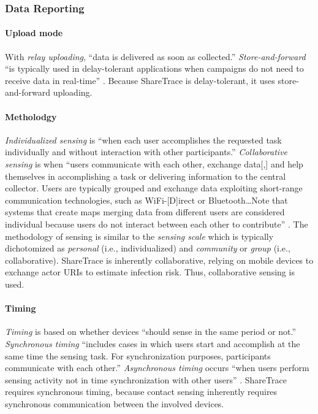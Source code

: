 \subsubsection{Data Reporting}

\paragraph{Upload mode}

With \emph{relay uploading}, ``data is delivered as soon as collected.'' \emph{Store-and-forward} ``is typically used in delay-tolerant applications when campaigns do not need to receive data in real-time'' \citep{Capponi2019}. Because ShareTrace is delay-tolerant, it uses store-and-forward uploading.

\paragraph{Metholodgy}

\emph{Individualized sensing} is ``when each user accomplishes the requested task individually and without interaction with other participants.'' \emph{Collaborative sensing} is when ``users communicate with each other, exchange data[,] and help themselves in accomplishing a task or delivering information to the central collector. Users are typically grouped and exchange data exploiting short-range communication technologies, such as WiFi-[D]irect or Bluetooth{\ldots}Note that systems that create maps merging data from different users are considered individual because users do not interact between each other to contribute'' \citep{Capponi2019}. The methodology of sensing is similar to the \emph{sensing scale} which is typically dichotomized as \emph{personal} \citep{Lane2010, Ganti2011} (i.e., individualized) and \emph{community} \citep{Ganti2011} or \emph{group} \citep{Lane2010} (i.e., collaborative). ShareTrace is inherently collaborative, relying on mobile devices to exchange actor URIs to estimate infection risk. Thus, collaborative sensing is used.

\paragraph{Timing}

\emph{Timing} is based on whether devices ``should sense in the same period or not.'' \emph{Synchronous timing} ``includes cases in which users start and accomplish at the same time the sensing task. For synchronization purposes, participants communicate with each other.'' \emph{Asynchronous timing} occurs ``when users perform sensing activity not in time synchronization with other users'' \citep{Capponi2019}. ShareTrace requires synchronous timing, because contact sensing inherently requires synchronous communication between the involved devices.

